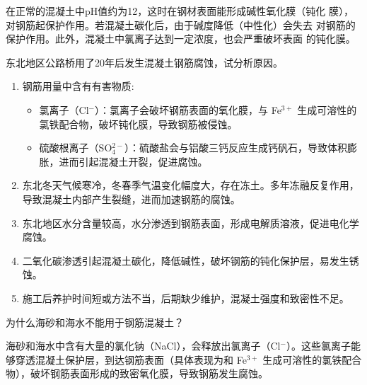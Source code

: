 \documentclass[12pt, a4paper, oneside, UTF8]{ctexbook}
\begin{document}
\begin{remark}
	在正常的混凝土中pH值约为12，这时在钢材表面能形成碱性氧化膜（钝化
膜），对钢筋起保护作用。若混凝土碳化后，由于碱度降低（中性化）会失去
对钢筋的保护作用。此外，混凝土中氯离子达到一定浓度，也会严重破坏表面
的钝化膜。
\end{remark}

\begin{example}
  东北地区公路桥用了20年后发生混凝土钢筋腐蚀，试分析原因。
  \begin{enumerate}
    \item 钢筋用量中含有有害物质:
  \begin{itemize}
    \item 氯离子（Cl$^-$）：氯离子会破坏钢筋表面的氧化膜，与 Fe$^{3+}$ 生成可溶性的氯铁配合物，破坏钝化膜，导致钢筋被侵蚀。
    \item 硫酸根离子（SO$_4^{2-}$）：硫酸盐会与铝酸三钙反应生成钙矾石，导致体积膨胀，进而引起混凝土开裂，促进腐蚀。
  \end{itemize}
  \item 东北冬天气候寒冷，冬春季气温变化幅度大，存在冻土。多年冻融反复作用，导致混凝土内部产生裂缝，进而加速钢筋的腐蚀。
  \item   东北地区水分含量较高，水分渗透到钢筋表面，形成电解质溶液，促进电化学腐蚀。
  \item   二氧化碳渗透引起混凝土碳化，降低碱性，破坏钢筋的钝化保护层，易发生锈蚀。
  \item 施工后养护时间短或方法不当，后期缺少维护，混凝土强度和致密性不足。
  \end{enumerate}
  
\end{example}

\begin{example}
  为什么海砂和海水不能用于钢筋混凝土？

海砂和海水中含有大量的氯化钠（NaCl），会释放出氯离子（Cl$^-$）。这些氯离子能够穿透混凝土保护层，到达钢筋表面（具体表现为和 Fe$^{3+}$ 生成可溶性的氯铁配合物），破坏钢筋表面形成的致密氧化膜，导致钢筋发生腐蚀。
\end{example}

\ifx\allfiles\undefined
\end{document}
